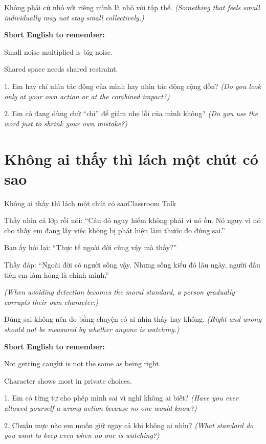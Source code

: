 \begin{baihoc}
Không phải cứ nhỏ với riêng mình là nhỏ với tập thể.
\textit{(Something that feels small individually may not stay small collectively.)}
\end{baihoc}

\begin{ghinhoanh}
\textbf{Short English to remember:}

Small noise multiplied is big noise.

Shared space needs shared restraint.
\end{ghinhoanh}

\begin{tuhocnhanh}
1. Em hay chỉ nhìn tác động của mình hay nhìn tác động cộng dồn? \textit{(Do you look only at your own action or at the combined impact?)}

2. Em có đang dùng chữ ``chỉ'' để giảm nhẹ lỗi của mình không? \textit{(Do you use the word just to shrink your own mistake?)}
\end{tuhocnhanh}
\ngancach

\section{Không ai thấy thì lách một chút có sao}
\begin{truyen}{Không ai thấy thì lách một chút có sao}{Classroom Talk}

Thầy nhìn cả lớp rồi nói: ``Câu đó nguy hiểm không phải vì nó ồn. Nó nguy vì nó cho thấy em đang lấy việc không bị phát hiện làm thước đo đúng sai.''

Bạn ấy hỏi lại: ``Thực tế ngoài đời cũng vậy mà thầy?''

Thầy đáp: ``Ngoài đời có người sống vậy. Nhưng sống kiểu đó lâu ngày, người đầu tiên em làm hỏng là chính mình.''

\textit{(When avoiding detection becomes the moral standard, a person gradually corrupts their own character.)}
\end{truyen}

\begin{baihoc}
Đúng sai không nên đo bằng chuyện có ai nhìn thấy hay không.
\textit{(Right and wrong should not be measured by whether anyone is watching.)}
\end{baihoc}

\begin{ghinhoanh}
\textbf{Short English to remember:}

Not getting caught is not the same as being right.

Character shows most in private choices.
\end{ghinhoanh}

\begin{tuhocnhanh}
1. Em có từng tự cho phép mình sai vì nghĩ không ai biết? \textit{(Have you ever allowed yourself a wrong action because no one would know?)}

2. Chuẩn mực nào em muốn giữ ngay cả khi không ai nhìn? \textit{(What standard do you want to keep even when no one is watching?)}
\end{tuhocnhanh}
\ngancach